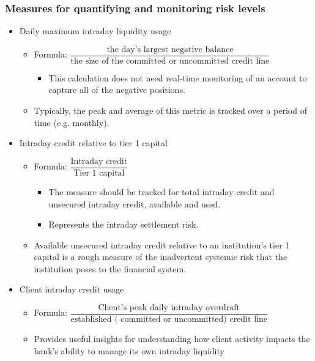 \subsubsection{Measures for quantifying and monitoring risk levels}
\begin{itemize}
\item Daily maximum intraday liquidity usage
    \begin{itemize}
    \item Formula: $\dfrac{\text{the day's largest negative balance}}{\text{the size of the committed or uncommitted credit line}}$
        \begin{itemize}
        \item This calculation does not need real-time monitoring of an account to capture all of the negative positions.
        \end{itemize}
    \item Typically, the peak and average of this metric is tracked over a period of time (e.g. monthly).

    \end{itemize}
    
\item Intraday credit relative to tier 1 capital
    \begin{itemize}
    \item Formula: $\dfrac{\text{Intraday credit}}{\text {Tier 1 capital}}$
        \begin{itemize}
        \item The measure should be tracked for total intraday credit and unsecured intraday credit, available and used.
        \item Represents the intraday settlement risk.
        \end{itemize}
    \item Available unsecured intraday credit relative to an institution's tier 1 capital is a rough measure of the inadvertent systemic risk that the institution poses to the financial system.

    \end{itemize}
\item Client intraday credit usage
    \begin{itemize}
    \item Formula: $\dfrac{\text{Client's peak daily intraday overdraft}}{\text {established ( committed or uncommitted) credit line}}$
    \item Provides useful insights for understanding how client activity impacts the bank's ability to manage its own
    intraday liquidity
    \end{itemize}
    

\end{itemize}
